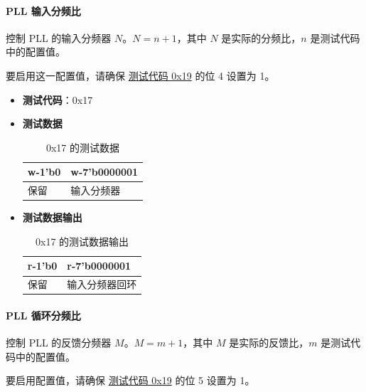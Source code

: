 \documentclass[main\_\_CN.tex]{subfiles}
\begin{document}
\paragraph{PLL 输入分频比}
\label{sec:test-code-0x17}
控制 PLL 的输入分频器 $N$。$N = n + 1$，其中 $N$ 是实际的分频比，$n$ 是测试代码中的配置值。

要启用这一配置值，请确保 \hyperref[sec:test-code-0x19]{测试代码 0x19} 的位 4 设置为 1。

\begin{itemize}
    \item \textbf{测试代码}：0x17
    \item \textbf{测试数据}
        \begin{longtable}{ |p{6cm}|p{6cm}|}
            \caption{0x17 的测试数据}
            \label{tab:test-data-0x17} \\
            \hline
            \rowcolor{lightgray}
            \textbf{w-1'b0} & \textbf{w-7'b0000001} \\ \hline
            保留 & 输入分频器  \\ \hline
        \end{longtable}
    \item \textbf{测试数据输出}
        \begin{longtable}{ |p{6cm}|p{6cm}|}
            \caption{0x17 的测试数据输出}
            \label{tab:test-dout-0x17} \\
            \hline
            \rowcolor{lightgray}
            \textbf{r-1'b0} & \textbf{r-7'b0000001} \\ \hline
            保留 & 输入分频器回环 \\ \hline
        \end{longtable}
\end{itemize}

\paragraph{PLL 循环分频比}
\label{sec:test-code-0x18}
控制 PLL 的反馈分频器 $M$。$M = m + 1$，其中 $M$ 是实际的反馈比，$m$ 是测试代码中的配置值。

要启用配置值，请确保 \hyperref[sec:test-code-0x19]{测试代码 0x19} 的位 5 设置为 1。
\end{document}
